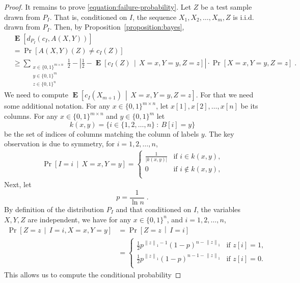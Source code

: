 \documentclass[10pt]{article}
\newcommand{\norm}[1]{\left\| #1 \right\|}
\DeclareMathOperator{\Exp}{\mathbf{E}}
\begin{document}
\begin{proof}
It remains to prove \eqref{equation:failure-probability}.
Let $Z$ be a test sample drawn from $P_I$. That is, conditioned on $I$, the sequence $X_1, X_2, \dots, X_m, Z$ is i.i.d. drawn from $P_I$.
Then, by Proposition~\ref{proposition:bayes},
\begin{align*}
& \Exp \left[d_{P_I}(c_I, A(X,Y))\right] \\
& = \Pr\left[ A(X,Y)(Z) \neq c_I(Z) \right] \\
& \ge \sum_{\substack{x \in \{0,1\}^{m \times n} \\ y \in \{0,1\}^m \\ z \in \{0,1\}^n}} \frac{1}{2} - \left| \frac{1}{2} - \Exp\left[ c_I(Z) \, \middle| \, X = x, Y = y, Z = z \right] \right| \cdot \Pr \left[X = x, Y = y, Z = z \right] \; .
\end{align*}
We need to compute $\Exp\left[ c_I(X_{m+1}) \, \middle| \, X = x, Y = y, Z = z \right]$.
For that we need some additional notation.
For any $x \in \{0,1\}^{m \times n}$, let $x[1], x[2], \dots, x[n]$ be its columns.
For any $x \in \{0,1\}^{m \times n}$ and $y \in \{0,1\}^m$ let
$$
k(x,y) = \{ i \in \{1,2,\dots,n\} ~:~ B[i] = y \}
$$
be the set of indices of columns matching the column of labels $y$. The key observation is due to symmetry, for $i = 1,2,\dots,n$,
\begin{align*}
\Pr \left[I = i \, \middle| \, X = x, Y = y \right]
=
\begin{cases}
\frac{1}{|k(x,y)|} & \text{if $i \in k(x,y)$,} \\
0 & \text{if $i \not \in k(x,y)$,} \\
\end{cases}
\end{align*}
Next, let
$$
p = \frac{1}{\ln n} \; .
$$
By definition of the distribution $P_I$ and that conditioned on $I$, the variables $X,Y,Z$ are independent,
we have for any $x \in \{0,1\}^n$, and $i = 1,2,\dots,n$,
\begin{align*}
\Pr \left[Z = z \, \middle| \, I = i, X = x, Y = y \right]
& = \Pr \left[Z = z \, \middle| \, I = i \right] \\
& =
\begin{cases}
\frac{1}{2} p^{\norm{z}_1 - 1} (1 - p)^{n - \norm{z}_1} & \text{if $z[i] = 1$,} \\
\frac{1}{2} p^{\norm{z}_1} (1-p)^{n-1 - \norm{z}_1}& \text{if $z[i] = 0$.} \\
\end{cases}
\end{align*}
This allows us to compute the conditional probability

\end{proof}
\end{document}
